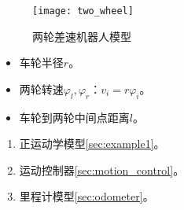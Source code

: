 \documentclass[
12pt, %
a4paper, 
oneside, %
headinclude,footinclude, %
]{scrartcl}
\begin{document}
\noindent
\begin{minipage}{0.3\textwidth}
\begin{figure}[H]
\centering
\texttt{[image: two\_wheel]} 
\caption{两轮差速机器人模型}
\end{figure}
\end{minipage}
\begin{minipage}{0.4\textwidth}
\begin{itemize}
\item 车轮半径$ r $。
\item 两轮转速$ \varphi_l,\varphi_r $：$ v_i = r\varphi_i $。
\item 车轮到两轮中间点距离$ l $。
\end{itemize}
\end{minipage}
\begin{minipage}{0.3\textwidth}
\begin{enumerate}
\item 正运动学模型\ref{sec:example1}。
\item 运动控制器\ref{sec:motion_control}。
\item 里程计模型\ref{sec:odometer}。
\end{enumerate}
\end{minipage}
\end{document}
